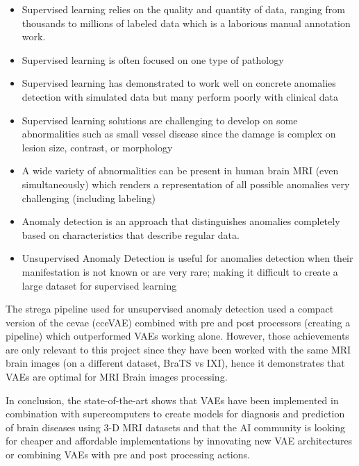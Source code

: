 \begin{itemize}
    \item Supervised learning relies on the quality and quantity of data, ranging from thousands to millions of labeled data which is a laborious manual annotation work.
    \item Supervised learning is often focused on one type of pathology
    \item Supervised learning has demonstrated to work well on concrete anomalies detection with simulated data but many perform poorly with clinical data
    \item Supervised learning solutions are challenging to develop on some abnormalities such as small vessel disease since the damage is complex on lesion size, contrast, or morphology
    \item A wide variety of abnormalities can be present in human brain MRI (even simultaneously) which renders a representation of all possible anomalies very challenging (including labeling)
    \item Anomaly detection is an approach that distinguishes anomalies completely based on characteristics that describe regular data.
    \item Unsupervised Anomaly Detection is useful for anomalies detection when their manifestation is not known or are very rare; making it difficult to create a large dataset for supervised learning
\end{itemize}

The \Acrshort{strega} pipeline used for unsupervised anomaly detection used a compact version of the \acrshort{cevae} (cceVAE) combined with pre and post processors (creating a pipeline) which outperformed VAEs working alone. However, those achievements are only relevant to this project since they have been worked with the same MRI brain images (on a different dataset, BraTS vs IXI), hence it demonstrates that VAEs are optimal for MRI Brain images processing.

In conclusion, the state-of-the-art shows that VAEs have been implemented in combination with supercomputers to create models for diagnosis and prediction of brain diseases using 3-D MRI datasets and that the AI community is looking for cheaper and affordable implementations by innovating new VAE architectures or combining VAEs with pre and post processing actions.